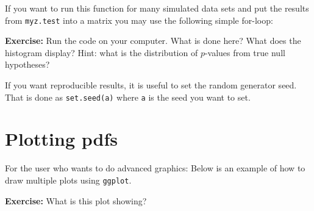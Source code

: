 \documentclass[]{article}
\newenvironment{Shaded}{\begin{snugshade}}{\end{snugshade}}
\newcommand{\KeywordTok}[1]{\textcolor[rgb]{0.13,0.29,0.53}{\textbf{#1}}}
\newcommand{\DataTypeTok}[1]{\textcolor[rgb]{0.13,0.29,0.53}{#1}}
\newcommand{\DecValTok}[1]{\textcolor[rgb]{0.00,0.00,0.81}{#1}}
\newcommand{\StringTok}[1]{\textcolor[rgb]{0.31,0.60,0.02}{#1}}
\newcommand{\CommentTok}[1]{\textcolor[rgb]{0.56,0.35,0.01}{\textit{#1}}}
\newcommand{\OtherTok}[1]{\textcolor[rgb]{0.56,0.35,0.01}{#1}}
\newcommand{\ControlFlowTok}[1]{\textcolor[rgb]{0.13,0.29,0.53}{\textbf{#1}}}
\newcommand{\OperatorTok}[1]{\textcolor[rgb]{0.81,0.36,0.00}{\textbf{#1}}}
\newcommand{\NormalTok}[1]{#1}
\begin{document}
If you want to run this function for many simulated data sets and put
the results from \texttt{myz.test} into a matrix you may use the
following simple for-loop:

\begin{Shaded}
\end{Shaded}

\textbf{Exercise:} Run the code on your computer. What is done here?
What does the histogram display? Hint: what is the distribution of
\(p\)-values from true null hypotheses?

\begingroup\color{dg}

\endgroup

If you want reproducible results, it is useful to set the random
generator seed. That is done as \texttt{set.seed(a)} where \texttt{a} is
the seed you want to set.

\section{Plotting pdfs}\label{plotting-pdfs}

For the user who wants to do advanced graphics: Below is an example of
how to draw multiple plots using \texttt{ggplot}.

\textbf{Exercise:} What is this plot showing?
\end{document}
